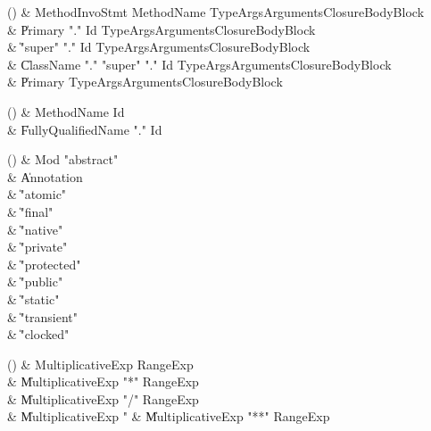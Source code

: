 \begin{bbgrammarappendix}{3.8in}

() & MethodInvoStmt \label{prod:MethodInvoStmt}  \:
         MethodName TypeArgs\opt Arguments\opt  ClosureBodyBlock \\
 &    \| Primary \xcd"." Id TypeArgs\opt Arguments\opt ClosureBodyBlock \\
 &    \| \xcd"super" \xcd"." Id TypeArgs\opt Arguments\opt ClosureBodyBlock \\
 &    \| ClassName \xcd"." \xcd"super"  \xcd"." Id TypeArgs\opt Arguments\opt ClosureBodyBlock \\
 &    \| Primary TypeArgs\opt Arguments\opt ClosureBodyBlock \\

\end{bbgrammarappendix}

\begin{bbgrammarappendix}{4.0in}

() & MethodName \label{prod:MethodName}  \: Id  \\

 &    \| FullyQualifiedName \xcd"." Id \\

\end{bbgrammarappendix}

\begin{bbgrammarappendix}{4.7in}

() & Mod \label{prod:Mod}  \: \xcd"abstract"  \\

 &    \| Annotation \\
 &    \| \xcd"atomic" \\
 &    \| \xcd"final" \\
 &    \| \xcd"native" \\
 &    \| \xcd"private" \\
 &    \| \xcd"protected" \\
 &    \| \xcd"public" \\
 &    \| \xcd"static" \\
 &    \| \xcd"transient" \\
 &    \| \xcd"clocked" \\

\end{bbgrammarappendix}

\begin{bbgrammarappendix}{3.3in}

() & MultiplicativeExp \label{prod:MultiplicativeExp}  \: RangeExp  \\

 &    \| MultiplicativeExp \xcd"*" RangeExp \\
 &    \| MultiplicativeExp \xcd"/" RangeExp \\
 &    \| MultiplicativeExp \xcd"%
 &    \| MultiplicativeExp \xcd"**" RangeExp \\

\end{bbgrammarappendix}

